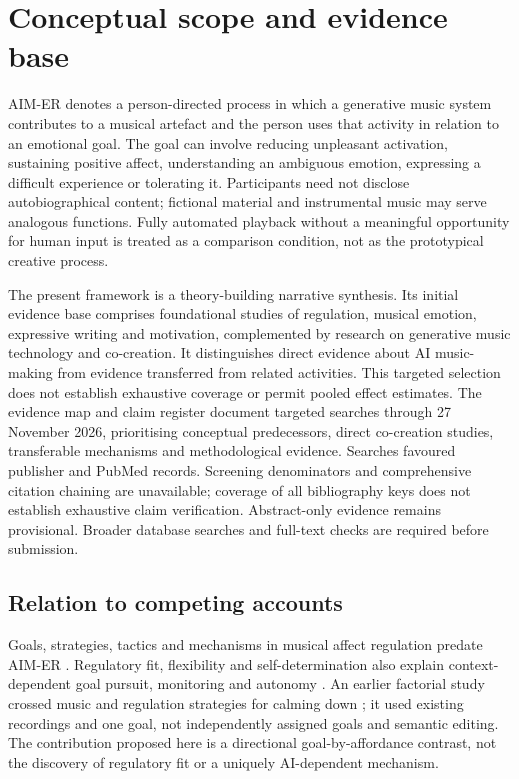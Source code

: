 \documentclass[11pt,a4paper]{article}
\begin{document}
\section{Conceptual scope and evidence base}
AIM-ER denotes a person-directed process in which a generative music system contributes to a musical artefact and the person uses that activity in relation to an emotional goal. The goal can involve reducing unpleasant activation, sustaining positive affect, understanding an ambiguous emotion, expressing a difficult experience or tolerating it. Participants need not disclose autobiographical content; fictional material and instrumental music may serve analogous functions. Fully automated playback without a meaningful opportunity for human input is treated as a comparison condition, not as the prototypical creative process.

The present framework is a theory-building narrative synthesis. Its initial evidence base comprises foundational studies of regulation, musical emotion, expressive writing and motivation, complemented by research on generative music technology and co-creation. It distinguishes direct evidence about AI music-making from evidence transferred from related activities. This targeted selection does not establish exhaustive coverage or permit pooled effect estimates. The evidence map and claim register document targeted searches through 27 November 2026, prioritising conceptual predecessors, direct co-creation studies, transferable mechanisms and methodological evidence. Searches favoured publisher and PubMed records. Screening denominators and comprehensive citation chaining are unavailable; coverage of all bibliography keys does not establish exhaustive claim verification. Abstract-only evidence remains provisional. Broader database searches and full-text checks are required before submission.

\subsection{Relation to competing accounts}
Goals, strategies, tactics and mechanisms in musical affect regulation predate AIM-ER \citep{baltazar2016,baltazar2019}. Regulatory fit, flexibility and self-determination also explain context-dependent goal pursuit, monitoring and autonomy \citep{higgins2000,bonanno2013,ryan2000}. An earlier factorial study crossed music and regulation strategies for calming down \citep{baltazarstress2019}; it used existing recordings and one goal, not independently assigned goals and semantic editing. The contribution proposed here is a directional goal-by-affordance contrast, not the discovery of regulatory fit or a uniquely AI-dependent mechanism.
\end{document}
